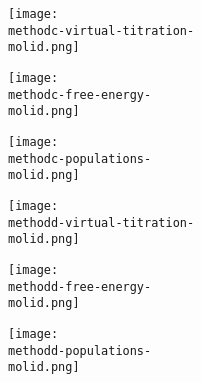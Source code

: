 \documentclass[11pt,final]{article}
\begin{document}
\noindent
\begin{minipage}[s]{0.32\textwidth}\centering
\texttt{[image: \\methodc-virtual-titration-\\molid.png]}
\end{minipage}
\begin{minipage}[s]{0.32\textwidth}
\texttt{[image: \\methodc-free-energy-\\molid.png]}
\end{minipage}
\begin{minipage}[s]{0.32\textwidth}
\texttt{[image: \\methodc-populations-\\molid.png]}
\end{minipage}

\begin{minipage}[s]{\textwidth}\centering
{\textbf \methodd}
\end{minipage}

\noindent
\begin{minipage}[s]{0.32\textwidth}\centering
\texttt{[image: \\methodd-virtual-titration-\\molid.png]}
\end{minipage}
\begin{minipage}[s]{0.32\textwidth}
\texttt{[image: \\methodd-free-energy-\\molid.png]}
\end{minipage}
\begin{minipage}[s]{0.32\textwidth}
\texttt{[image: \\methodd-populations-\\molid.png]}
\end{minipage}
\end{document}
